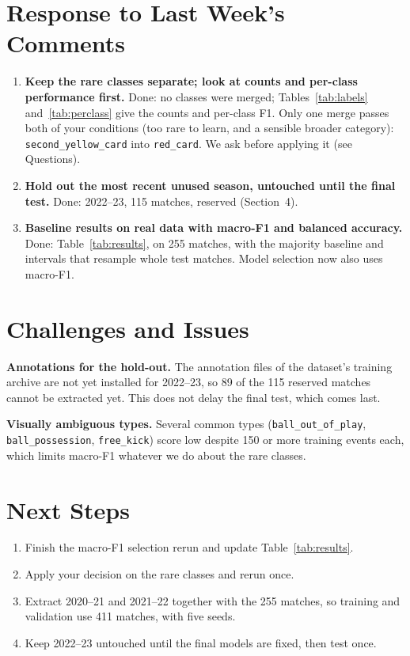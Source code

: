 \documentclass[11pt]{article}
\begin{document}
\section*{Response to Last Week's Comments}
\begin{enumerate}[noitemsep]
  \item \textbf{Keep the rare classes separate; look at counts and per-class performance first.} Done: no
        classes were merged; Tables~\ref{tab:labels} and~\ref{tab:perclass} give the counts and per-class F1.
        Only one merge passes both of your conditions (too rare to learn, and a sensible broader category):
        \texttt{second\_yellow\_card} into \texttt{red\_card}. We ask before applying it (see Questions).
  \item \textbf{Hold out the most recent unused season, untouched until the final test.} Done: 2022--23,
        115 matches, reserved (Section~4).
  \item \textbf{Baseline results on real data with macro-F1 and balanced accuracy.} Done:
        Table~\ref{tab:results}, on 255 matches, with the majority baseline and intervals that resample
        whole test matches. Model selection now also uses macro-F1.
\end{enumerate}

\section*{Challenges and Issues}
\textbf{Annotations for the hold-out.} The annotation files of the dataset's training archive are not yet
installed for 2022--23, so 89 of the 115 reserved matches cannot be extracted yet. This does not delay the
final test, which comes last.

\textbf{Visually ambiguous types.} Several common types (\texttt{ball\_out\_of\_play},
\texttt{ball\_possession}, \texttt{free\_kick}) score low despite 150 or more training events each, which limits macro-F1
whatever we do about the rare classes.

\section*{Next Steps}
\begin{enumerate}[noitemsep]
  \item Finish the macro-F1 selection rerun and update Table~\ref{tab:results}.
  \item Apply your decision on the rare classes and rerun once.
  \item Extract 2020--21 and 2021--22 together with the 255 matches, so training and validation use 411
        matches, with five seeds.
  \item Keep 2022--23 untouched until the final models are fixed, then test once.
\end{enumerate}
\end{document}
